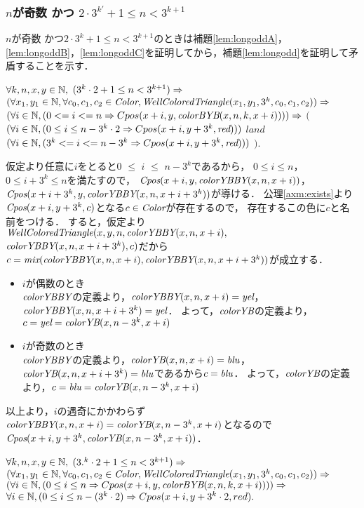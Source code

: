 \subsubsection{$n$が奇数 かつ $2 \cdot 3^{k'} + 1 \leq n < 3^{k+1}$}
$n$が奇数 かつ$2 \cdot 3^{k} + 1 \leq n < 3^{k+1}$のときは補題\ref{lem:longoddA}，\ref{lem:longoddB}，\ref{lem:longoddC}を証明してから，補題\ref{lem:longodd}を証明して矛盾することを示す．
\begin{lem}[\LongOddA] \label{lem:longoddA}
  $\forall k,n,x,y \in \mathbb{N},$
  $(3^k\cdot2 + 1 \leq n < 3^{k+1}) \Rightarrow$
  $(\forall x_1,y_1 \in \mathbb{N}, \forall c_0,c_1,c_2 \in \textit{Color}, \textit{WellColoredTriangle}(x_1,y_1,3^k,c_0,c_1,c_2)) \Rightarrow$
  $(\forall i \in \mathbb{N},(0 <= i <= n \Rightarrow Cpos(x+i,y,\textit{colorBYB}(x,n,k,x+i)))) \Rightarrow$ 
      $($
        $(\forall i \in \mathbb{N},(0 \leq i \leq n - 3^k\cdot2 \Rightarrow Cpos(x+i,y+3^k,\textit{red})))$
        $land$
        $(\forall i \in \mathbb{N},(3^k <= i <= n - 3^k \Rightarrow Cpos(x+i,y+3^k,\textit{red})))$
      $)$.
\end{lem}
仮定より任意に$i$をとると$0$ $\leq$ $i$ $\leq$ $n-3^k$であるから，
  $0 \leq i \leq n$，$0 \leq i+3^k \leq n$を満たすので，
  $\textit{Cpos}(x+i,y,\textit{colorYBBY}(x,n,x+i))$，$\textit{Cpos}(x+i+3^k,y,\textit{colorYBBY}(x,n,x+i+3^k))$が導ける．
  公理\ref{axm:exists}より$\textit{Cpos}(x+i,y+3^k,c)$となる$c\in\textit{Color}$が存在するので，
  存在するこの色に$c$と名前をつける．
  すると，仮定より$\textit{WellColoredTriangle}(x,y,n,\textit{colorYBBY}(x,n,x+i),$ $\textit{colorYBBY}(x,n,x+i+3^k),c)$だから$c=\textit{mix}(\textit{colorYBBY}(x,n,x+i),\textit{colorYBBY}(x,n,x+i+3^k))$が成立する．
  \begin{itemize}
  \item
    $i$が偶数のとき \\
    $\textit{colorYBBY}$の定義より，$\textit{colorYBBY}(x,n,x+i)=\textit{yel}$，$\textit{colorYBBY}(x,n,x+i+3^k)=\textit{yel}$．
    よって，$\textit{colorYB}$の定義より，$c=\textit{yel}=\textit{colorYB}(x,n-3^k,x+i)$
  \item
    $i$が奇数のとき \\
    $\textit{colorYBBY}$の定義より，$\textit{colorYB}(x,n,x+i)=\textit{blu}$，$\textit{colorYB}(x,n,x+i+3^k)=\textit{blu}$であるから$c=\textit{blu}$．
    よって，$\textit{colorYB}$の定義より，$c=\textit{blu}=\textit{colorYB}(x,n-3^k,x+i)$
  \end{itemize}
  以上より，$i$の遇奇にかかわらず$\textit{colorYBBY}(x,n,x+i)=\textit{colorYB}(x,n-3^k,x+i)$となるので$\textit{Cpos}(x+i,y+3^k,\textit{colorYB}(x,n-3^k,x+i))$．
\begin{lem}[\LongOddB] \label{lem:longoddB}
  $\forall k,n,x,y \in \mathbb{N},$
  $(3.^k\cdot2 + 1 \leq n < 3^{k+1}) \Rightarrow$
  $(\forall x_1,y_1 \in \mathbb{N}, \forall c_0,c_1,c_2 \in \textit{Color}, \textit{WellColoredTriangle}(x_1,y_1,3^k,c_0,c_1,c_2)) \Rightarrow$
  $(\forall i \in \mathbb{N},(0 \leq i \leq n \Rightarrow Cpos(x+i, y, \textit{colorBYB}(x,n,k,x+i)))) \Rightarrow$ 
  $\forall i \in \mathbb{N}, (0 \leq i \leq n-(3^k\cdot2) \Rightarrow Cpos(x+i,y+3^k\cdot2,red).$
\end{lem}
